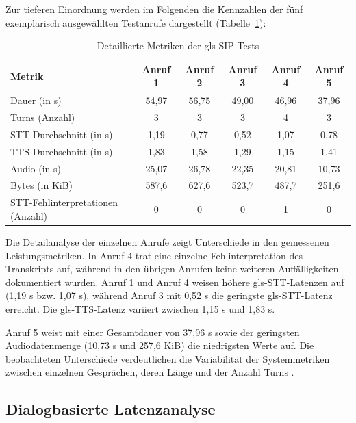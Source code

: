 Zur tieferen Einordnung werden im Folgenden die Kennzahlen der fünf exemplarisch ausgewählten Testanrufe dargestellt (Tabelle~\ref{tab:sip-calls-detail}):

\begin{table}[H]
  \centering
  \small
  \begin{tabular}{|l|c|c|c|c|c|}
    \hline
    \textbf{Metrik} & \textbf{Anruf 1} & \textbf{Anruf 2} & \textbf{Anruf 3} & \textbf{Anruf 4} & \textbf{Anruf 5} \\ \hline
    Dauer (in s) & 54,97 & 56,75 & 49,00 & 46,96 & 37,96 \\ \hline
    Turns (Anzahl) & 3 & 3 & 3 & 4 & 3 \\ \hline
    STT-Durchschnitt (in s) & 1,19 & 0,77 & 0,52 & 1,07 & 0,78 \\ \hline
    TTS-Durchschnitt (in s) & 1,83 & 1,58 & 1,29 & 1,15 & 1,41 \\ \hline
    Audio (in s) & 25,07 & 26,78 & 22,35 & 20,81 & 10,73 \\ \hline
    Bytes (in KiB) & 587,6 & 627,6 & 523,7 & 487,7 & 251,6 \\ \hline
    STT-Fehlinterpretationen (Anzahl) & 0 & 0 & 0 & 1 & 0 \\ \hline
  \end{tabular}
  \caption{Detaillierte Metriken der \gls{gls-SIP}-Tests}
  \label{tab:sip-calls-detail}
\end{table}

Die Detailanalyse der einzelnen Anrufe zeigt Unterschiede in den gemessenen Leistungsmetriken. In Anruf 4 trat eine einzelne Fehlinterpretation des Transkripts auf, während in den übrigen Anrufen keine weiteren Auffälligkeiten dokumentiert wurden. Anruf 1 und Anruf 4 weisen höhere \gls{gls-STT}-Latenzen auf (1,19 s bzw. 1,07 s), während Anruf 3 mit 0,52 s die geringste \gls{gls-STT}-Latenz erreicht. Die \gls{gls-TTS}-Latenz variiert zwischen 1,15 s und 1,83 s.

Anruf 5 weist mit einer Gesamtdauer von 37,96 s sowie der geringsten Audiodatenmenge (10,73 s und 257,6 KiB) die niedrigsten Werte auf. Die beobachteten Unterschiede verdeutlichen die Variabilität der Systemmetriken zwischen einzelnen Gesprächen, deren Länge und der Anzahl Turns \parencite{Data2025_AIDataQuality,ssrn5348245}.

\subsection{Dialogbasierte Latenzanalyse}

